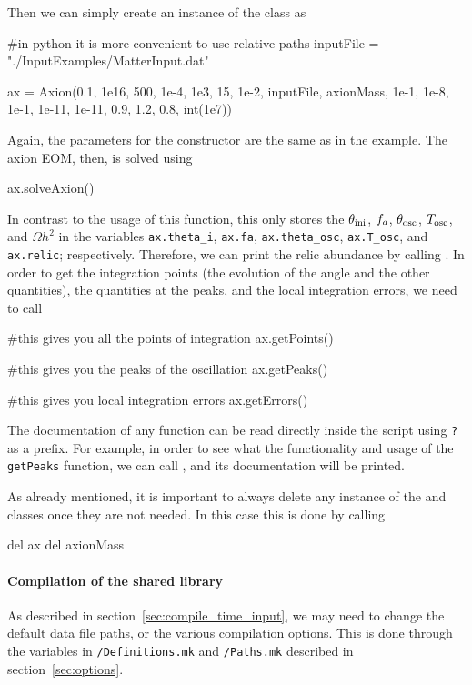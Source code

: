 \documentclass[11pt,a4paper]{article}
\begin{document}
Then we can simply create an instance of the  class as 
%
\begin{py}
	#in python it is more convenient to use relative paths
	inputFile = "./InputExamples/MatterInput.dat"  
	
	ax = Axion(0.1, 1e16, 500, 1e-4, 1e3, 15, 1e-2, inputFile, axionMass, 
	1e-1, 1e-8, 1e-1, 1e-11, 1e-11, 0.9, 1.2, 0.8, int(1e7))
\end{py}
%
Again, the parameters for the constructor are the same as in the \CPP example. The axion EOM, then, is solved using
%
\begin{py}
	ax.solveAxion()
\end{py}
%
In contrast to the \CPP usage of this function, this only stores the $\theta_{\rm ini}{}$, $f_{a}{}$, $\theta_{\rm osc}{}$, $T_{\rm osc}{}$, and $\Omega h^2$ in the variables {\tt ax.theta\_i}, {\tt ax.fa}, {\tt ax.theta\_osc}, {\tt ax.T\_osc}, and {\tt ax.relic}; respectively. Therefore, we can print the relic abundance by calling . In order to get the integration points (\ie the evolution of the angle and the other quantities), the quantities at the  peaks, and the local integration errors, we need to call
%
\begin{py}
	#this gives you all the points of integration
	ax.getPoints()
	
	#this gives you the peaks of the oscillation
	ax.getPeaks()
	
	#this gives you local integration errors
	ax.getErrors()
\end{py}
%
The documentation of any \PY function can be read directly inside the script using {\tt ?} as a prefix. For example, in order to see what the functionality and usage of the {\tt getPeaks} function, we can call , and its documentation will be printed. 

As already mentioned, it is important to always delete any instance of the  and  classes once they are not needed. In this case this is done by calling
%
\begin{py}
	del ax
	del axionMass
\end{py}


\paragraph{Compilation of the shared library}
%
As described in section~\ref{sec:compile_time_input}, we may need to change the default data file paths, or the various compilation options. This is done through the variables in {\tt \mimes/Definitions.mk} and {\tt \mimes/Paths.mk} described in section~\ref{sec:options}. 
\end{document}
